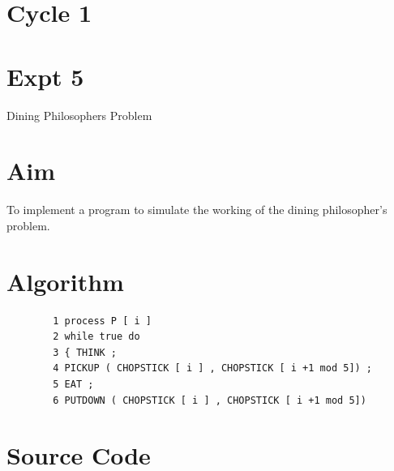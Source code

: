 \documentclass[13pt,oneside]{book}
\begin{document}
\section*{Cycle 1}
\section*{Expt 5}
\begin{center}
    \Large{Dining Philosophers Problem}
\end{center}
\section*{Aim}
\large
To implement a program to simulate the working of the dining
philosopher’s problem.

\section*{Algorithm} 
    \begin{verbatim}
		1 process P [ i ]
		2 while true do
		3 { THINK ;
		4 PICKUP ( CHOPSTICK [ i ] , CHOPSTICK [ i +1 mod 5]) ;
		5 EAT ;
		6 PUTDOWN ( CHOPSTICK [ i ] , CHOPSTICK [ i +1 mod 5])
	\end{verbatim}

\section*{Source Code}
\small
\end{document}

